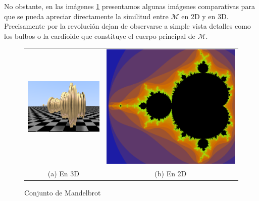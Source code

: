 No obstante, en las imágenes \ref{fig:mandelbrot-2D-3D} presentamos algunas imágenes comparativas para que se pueda apreciar directamente la similitud entre $\mathcal{M}$ en 2D y en 3D. Precisamente por la revolución dejan de observarse a simple vista detalles como los bulbos o la cardioide que constituye el cuerpo principal de $\mathcal{M}$.

\begin{figure}[ht]
    \centering
    \begin{tabular}{cc}
        \includegraphics[scale=0.53]{img/C8/mandelbrot-3d.png} &
        \includegraphics[scale=0.23]{img/C8/mandelbrot-2d.png} \\
          
    (a) En 3D & (b) En 2D  \\
    \end{tabular}
    \caption{Conjunto de Mandelbrot}
    \label{fig:mandelbrot-2D-3D}
\end{figure}

